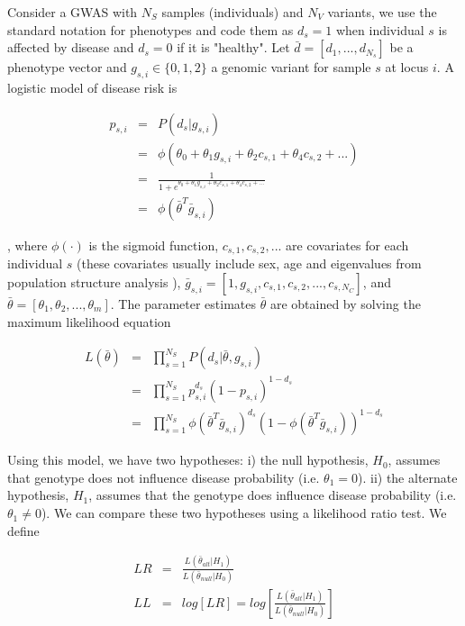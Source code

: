 Consider a GWAS with $N_S$  samples (individuals) and $N_V$ variants, we use the standard notation for phenotypes and code them as $d_s=1$ when individual $s$ is affected by disease and $d_s=0$ if it is "healthy". Let $\bar{d} = [d_1, ..., d_{N_s}]$ be a phenotype vector and $g_{s,i} \in \{0,1,2\}$ a genomic variant for sample $s$ at locus $i$. A logistic model of disease risk \cite{balding2006tutorial} is

\begin{eqnarray*}
    p_{s,i} & = & P( d_s | g_{s,i} ) \\
    & = & \phi( \theta_0 + \theta_1 g_{s,i} + \theta_2 c_{s,1} + \theta_4 c_{s,2} + ... ) \\
    & = & \frac{1}{1 + e^{\theta_0 + \theta_1 g_{s,i} + \theta_2 c_{s,1} + \theta_4 c_{s,2} + ...}} \\
    & = & \phi( \bar{\theta}^T \bar{g}_{s,i})
\end{eqnarray*}

, where $\phi(\cdot)$ is the sigmoid function, $c_{s,1}, c_{s,2}, ... $ are covariates for each individual $s$ (these covariates usually include sex, age and eigenvalues from population structure analysis \cite{price2006principal}), $\bar{g}_{s,i} = [ 1, g_{s,i} , c_{s,1}, c_{s,2}, ... , c_{s,N_C} ]$, and $\bar{\theta} = [\theta_1, \theta_2, ..., \theta_m] $. The parameter estimates $\bar{\theta}$ are obtained by solving the maximum likelihood equation

\begin{eqnarray*}
    L( \bar{\theta} ) & = & \prod_{s=1}^{N_S}{ P( d_s | \bar{\theta}, g_{s,i} ) } \\
    & = & \prod_{s=1}^{N_S}{ p_{s,i}^{d_s} (1-p_{s,i})^{1-d_s} } \\
    & = & \prod_{s=1}^{N_S}{ \phi( \bar{\theta}^T \bar{g}_{s,i})^{d_s} (1-\phi( \bar{\theta}^T \bar{g}_{s,i}))^{1-d_s} }
\end{eqnarray*}


Using this model, we have two hypotheses: i) the null hypothesis, $H_0$, assumes that genotype does not influence disease probability (i.e. $\theta_1 = 0$). ii) the alternate hypothesis, $H_1$, assumes that the genotype does influence disease probability (i.e. $\theta_1 \neq 0$). We can compare these two hypotheses using a likelihood ratio test. We define

\begin{eqnarray} \label{eq:gwasLogLikLogReg}
	LR & = & \frac{L( \bar{\theta}_{alt} | H_1 ) }{ L( \bar{\theta}_{null} | H_0 ) }\\
	LL & = & log \left[ LR \right] = log \left[ \frac{L( \bar{\theta}_{alt} | H_1 ) }{ L( \bar{\theta}_{null} | H_0 ) } \right]
\end{eqnarray}

